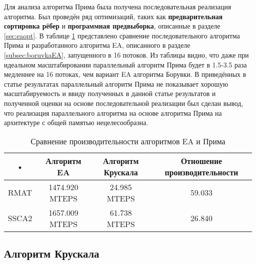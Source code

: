 \documentclass[a4paper,12pt]{extarticle}
\begin{document}
Для анализа алгоритма Прима была получена последовательная реализация алгоритма.
Был проведён ряд оптимизаций, таких как \textbf{предварительная сортировка рёбер} и \textbf{программная предвыборка}, описанные в разделе \ref{sec:eaopt}.
В таблице \ref{tabel:primaSeq} представлено сравнение последовательного алгоритма Прима и разработанного алгоритма EA, описанного в разделе \ref{subsec:boruvkaEA}, запущенного в 16 потоков.
Из таблицы видно, что даже при идеальном масштабировании параллельный алгоритм Прима будет в 1.5-3.5 раза медленнее на 16 потоках, чем вариант EA алгоритма Борувки.
В приведённых в статье \cite{boruvka-prima} результатах параллельный алгоритм Прима не показывает хорошую масштабируемость и ввиду полученных в данной статье результатов и полученной оценки на основе последовательной реализации был сделан вывод, что реализация параллельного алгоритма на основе алгоритма Прима на архитектуре с общей памятью нецелесообразна.

\begin{table}
    \caption{Сравнение производительности алгоритмов EA и Прима}
    \label{tabel:primaSeq}
    \begin{center}
        \begin{tabular}{|c|c|c|c|}
            \hline 
            \rule[-1ex]{0pt}{2.5ex} • & Алгоритм EA & Алгоритм Крускала & Отношение производительности \\ 
            \hline 
            \rule[-1ex]{0pt}{2.5ex} RMAT & 1474.920 MTEPS & 24.985 MTEPS & 59.033 \\ 
            \hline 
            \rule[-1ex]{0pt}{2.5ex} SSCA2 & 1657.009 MTEPS & 61.738 MTEPS & 26.840 \\ 
            \hline 
        \end{tabular}
    \end{center}
\end{table} 

\subsection{Алгоритм Крускала}
\label{subsec:algoKruskal}
\end{document}
